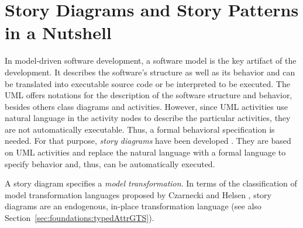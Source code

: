 \section{Story Diagrams and Story Patterns in a Nutshell} \label{sec:Overview}



In model-driven software development, a software model is the key artifact of the development.
It describes the software's structure as well as its behavior and 
can be translated into executable source code or be interpreted to be executed.
The UML offers notations for the description of the software structure and behavior,
besides others class diagrams and activities.
However, since UML activities use natural language in the activity nodes to describe the particular activities, they are not automatically executable.
Thus, a formal behavioral specification is needed.
For that purpose, \emph{story diagrams} have been developed \cite{FNTZ00,Zun01}.
They are based on UML activities \cite{UML23} and replace the natural language with a formal language to specify behavior
and, thus, can be automatically executed.

A story diagram specifies a \emph{model transformation}.
In terms of the classification of model transformation languages proposed by Czarnecki and Helsen \cite{Czarnecki06},
story diagrams are an endogenous, in-place transformation language (see also Section~\ref{sec:foundations:typedAttrGTS}).


